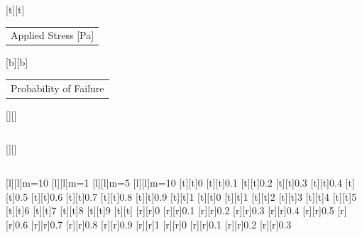 %    
%
%
\begin{psfrags}%
\psfragscanon%
%
[t][t]{\color[rgb]{0,0,0}\setlength{\tabcolsep}{0pt}\begin{tabular}{c}Applied Stress [Pa]\end{tabular}}%
[b][b]{\color[rgb]{0,0,0}\setlength{\tabcolsep}{0pt}\begin{tabular}{c}Probability of Failure\end{tabular}}%
[][]{\color[rgb]{0,0,0}\setlength{\tabcolsep}{0pt}\begin{tabular}{c} \end{tabular}}%
[][]{\color[rgb]{0,0,0}\setlength{\tabcolsep}{0pt}\begin{tabular}{c} \end{tabular}}%
[l][l]{\color[rgb]{0,0,0}m=10}%
[l][l]{\color[rgb]{0,0,0}m=1}%
[l][l]{\color[rgb]{0,0,0}m=5}%
[l][l]{\color[rgb]{0,0,0}m=10}%
%
[t][t]{0}%
[t][t]{0.1}%
[t][t]{0.2}%
[t][t]{0.3}%
[t][t]{0.4}%
[t][t]{0.5}%
[t][t]{0.6}%
[t][t]{0.7}%
[t][t]{0.8}%
[t][t]{0.9}%
[t][t]{1}%
[t][t]{0}%
[t][t]{1}%
[t][t]{2}%
[t][t]{3}%
[t][t]{4}%
[t][t]{5}%
[t][t]{6}%
[t][t]{7}%
[t][t]{8}%
[t][t]{9}%
[t][t]{}%
%
[r][r]{0}%
[r][r]{0.1}%
[r][r]{0.2}%
[r][r]{0.3}%
[r][r]{0.4}%
[r][r]{0.5}%
[r][r]{0.6}%
[r][r]{0.7}%
[r][r]{0.8}%
[r][r]{0.9}%
[r][r]{1}%
[r][r]{0}%
[r][r]{0.1}%
[r][r]{0.2}%
[r][r]{0.3}%

\end{psfrags}
